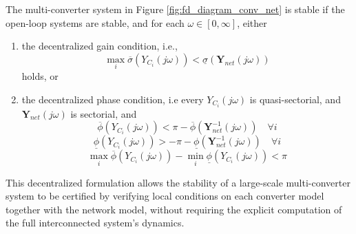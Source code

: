 \begin{thm}
    The multi-converter system in Figure \ref{fig:fd_diagram_conv_net} is stable if the open-loop systems are stable, and for each $\omega \in [0,\infty]$, either
    \begin{enumerate}
        \item 
        the decentralized gain condition, i.e.,
        \begin{equation*}
            \max_i \overline{\sigma}(Y_{C_i}(j\omega))<\underline{\sigma}(\mathbf{Y}_{net}(j\omega))
        \end{equation*}
        holds, or
        \item 
        the decentralized phase condition, i.e
        every $Y_{C_i}(j\omega)$ is quasi-sectorial, and $\mathbf{Y}_{net}(j\omega)$ is sectorial, and
        \begin{equation*}
            \overline{\phi}(Y_{C_i}(j\omega))<\pi-\overline{\phi}(\mathbf{Y}_{net}^{-1}(j\omega)) \quad \forall i
        \end{equation*}
        \begin{equation*}
            \underline{\phi}(Y_{C_i}(j\omega))>-\pi-\underline{\phi}(\mathbf{Y}_{net}^{-1}(j\omega))\quad \forall i
        \end{equation*}
        \begin{equation*}
            \max_i\overline{\phi}(Y_{C_i}(j\omega)) -\min_i\underline{\phi}(Y_{C_i}(j\omega))<\pi
        \end{equation*}
    \end{enumerate}
    \label{thm:dec_mixed_small_gain_phase}
\end{thm}
This decentralized formulation allows the stability of a large-scale multi-converter system to be certified by verifying local conditions on each converter model together with the network model, without requiring the explicit computation of the full interconnected system’s dynamics.